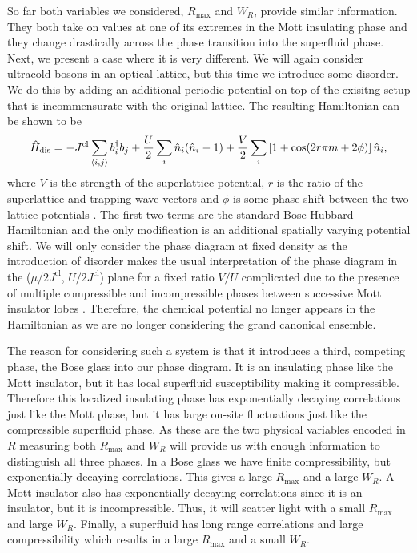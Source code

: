 So far both variables we considered, $R_\text{max}$ and $W_R$, provide
similar information. They both take on values at one of its extremes
in the Mott insulating phase and they change drastically across the
phase transition into the superfluid phase. Next, we present a case
where it is very different. We will again consider ultracold bosons in
an optical lattice, but this time we introduce some disorder. We do
this by adding an additional periodic potential on top of the exisitng
setup that is incommensurate with the original lattice. The resulting
Hamiltonian can be shown to be
\begin{equation}
  \hat{H}_\mathrm{dis} = -J^\mathrm{cl} \sum_{\langle i, j \rangle}
  b^\dagger_i b_j + \frac{U}{2} \sum_i \hat{n}_i (\hat{n}_i - 1) +
  \frac{V}{2} \sum_i \left[ 1 + \cos (2 r \pi m + 2 \phi) \right]
  \hat{n}_i,
\end{equation}
where $V$ is the strength of the superlattice potential, $r$ is the
ratio of the superlattice and trapping wave vectors and $\phi$ is some
phase shift between the two lattice potentials \cite{roux2008}. The
first two terms are the standard Bose-Hubbard Hamiltonian and the only
modification is an additional spatially varying potential shift. We
will only consider the phase diagram at fixed density as the
introduction of disorder makes the usual interpretation of the phase
diagram in the ($\mu/2J^\text{cl}$, $U/2J^\text{cl}$) plane for a
fixed ratio $V/U$ complicated due to the presence of multiple
compressible and incompressible phases between successive Mott
insulator lobes \cite{roux2008}. Therefore, the chemical potential no
longer appears in the Hamiltonian as we are no longer considering the
grand canonical ensemble.

The reason for considering such a system is that it introduces a
third, competing phase, the Bose glass into our phase diagram. It is
an insulating phase like the Mott insulator, but it has local
superfluid susceptibility making it compressible. Therefore this
localized insulating phase has exponentially decaying correlations
just like the Mott phase, but it has large on-site fluctuations just
like the compressible superfluid phase. As these are the two physical
variables encoded in $R$ measuring both $R_\text{max}$ and $W_R$ will
provide us with enough information to distinguish all three phases. In
a Bose glass we have finite compressibility, but exponentially
decaying correlations. This gives a large $R_\text{max}$ and a large
$W_R$. A Mott insulator also has exponentially decaying correlations
since it is an insulator, but it is incompressible. Thus, it will
scatter light with a small $R_\text{max}$ and large $W_R$. Finally, a
superfluid has long range correlations and large compressibility which
results in a large $R_\text{max}$ and a small $W_R$.

